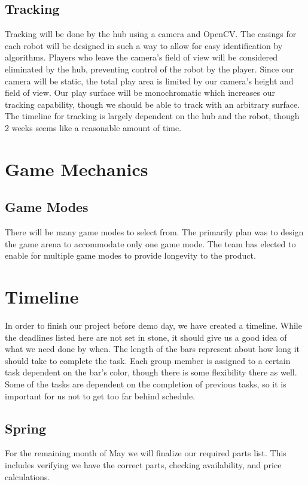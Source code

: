 \documentclass[11pt]{ieeeconf}
\begin{document}
\subsection{Tracking}

Tracking will be done by the hub using a camera and OpenCV. The casings for each robot will be designed in such a way to allow for easy identification by algorithms. Players who leave the camera's field of view will be considered eliminated by the hub, preventing control of the robot by the player. Since our camera will be static, the total play area is limited by our camera's height and field of view. Our play surface will be monochromatic which increases our tracking capability, though we should be able to track with an arbitrary surface. The timeline for tracking is largely dependent on the hub and the robot, though 2 weeks seems like a reasonable amount of time.

\section{Game Mechanics}

\subsection{Game Modes}

There will be many game modes to select from. The primarily plan was to design the game arena to accommodate only one game mode. The team has elected to enable for multiple game modes to provide longevity to the product.    

\section{Timeline}

In order to finish our project before demo day, we have created a timeline. While the deadlines listed here are not set in stone, it should give us a good idea of what we need done by when. The length of the bars represent about how long it should take to complete the task. Each group member is assigned to a certain task dependent on the bar's color, though there is some flexibility there as well. Some of the tasks are dependent on the completion of previous tasks, so it is important for us not to get too far behind schedule. 

\subsection{Spring}
For the remaining month of May we will finalize our required parts list. This includes verifying we have the correct parts, checking availability, and price calculations.
\end{document}
